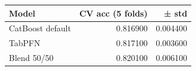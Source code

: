 \begin{tabular}{lrr}
\toprule
Model & CV acc (5 folds) & ± std \\
\midrule
CatBoost default & 0.816900 & 0.004400 \\
TabPFN & 0.817100 & 0.003600 \\
Blend 50/50 & 0.820100 & 0.006100 \\
\bottomrule
\end{tabular}
